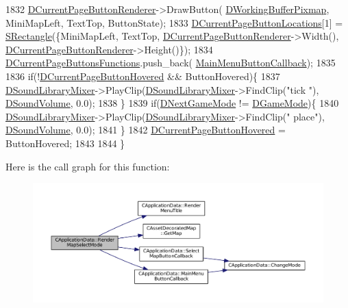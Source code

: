 \begin{DoxyCode}
1832     \hyperlink{classCApplicationData_abfe1743f2634b069ccc811db4a8733a8}{DCurrentPageButtonRenderer}->DrawButton(
      \hyperlink{classCApplicationData_afa34cf2780f38dd28c0c811e69d60a97}{DWorkingBufferPixmap}, MiniMapLeft, TextTop, ButtonState);
1833     \hyperlink{classCApplicationData_a3615df8e23cea3ce17f11cf61340a7b4}{DCurrentPageButtonLocations}[1] = \hyperlink{structSRectangle}{SRectangle}(\{MiniMapLeft, TextTop,
       \hyperlink{classCApplicationData_abfe1743f2634b069ccc811db4a8733a8}{DCurrentPageButtonRenderer}->Width(), 
      \hyperlink{classCApplicationData_abfe1743f2634b069ccc811db4a8733a8}{DCurrentPageButtonRenderer}->Height()\});
1834     \hyperlink{classCApplicationData_ad3079e5563a19d21c1e4ceff2a188382}{DCurrentPageButtonsFunctions}.push\_back(
      \hyperlink{classCApplicationData_a4410839118b5b74dab798ad7be6f703b}{MainMenuButtonCallback});
1835     
1836     \textcolor{keywordflow}{if}(!\hyperlink{classCApplicationData_a96b3a9b5c9965540007dff3fa85587fa}{DCurrentPageButtonHovered} && ButtonHovered)\{
1837         \hyperlink{classCApplicationData_aa1e6876121bb4fb229ec6b930a8a6766}{DSoundLibraryMixer}->PlayClip(\hyperlink{classCApplicationData_aa1e6876121bb4fb229ec6b930a8a6766}{DSoundLibraryMixer}->FindClip(\textcolor{stringliteral}{"tick
      "}), \hyperlink{classCApplicationData_aa6e540f860dcb1929ef36ddce3be3691}{DSoundVolume}, 0.0);
1838     \}
1839     \textcolor{keywordflow}{if}(\hyperlink{classCApplicationData_a3b67edeacd70201dcf96fa9fa8aa2107}{DNextGameMode} != \hyperlink{classCApplicationData_a2f906f2b4208ecb2a057e6b62e549685}{DGameMode})\{
1840         \hyperlink{classCApplicationData_aa1e6876121bb4fb229ec6b930a8a6766}{DSoundLibraryMixer}->PlayClip(\hyperlink{classCApplicationData_aa1e6876121bb4fb229ec6b930a8a6766}{DSoundLibraryMixer}->FindClip(\textcolor{stringliteral}{"
      place"}), \hyperlink{classCApplicationData_aa6e540f860dcb1929ef36ddce3be3691}{DSoundVolume}, 0.0);
1841     \}
1842     \hyperlink{classCApplicationData_a96b3a9b5c9965540007dff3fa85587fa}{DCurrentPageButtonHovered} = ButtonHovered;
1843 
1844 \}
\end{DoxyCode}
Here is the call graph for this function\+:\nopagebreak
\begin{figure}[H]
\begin{center}
\leavevmode
\includegraphics[width=350pt]{classCApplicationData_a72fff3a266be49b3e9f323dcfe545923_cgraph}
\end{center}
\end{figure}
